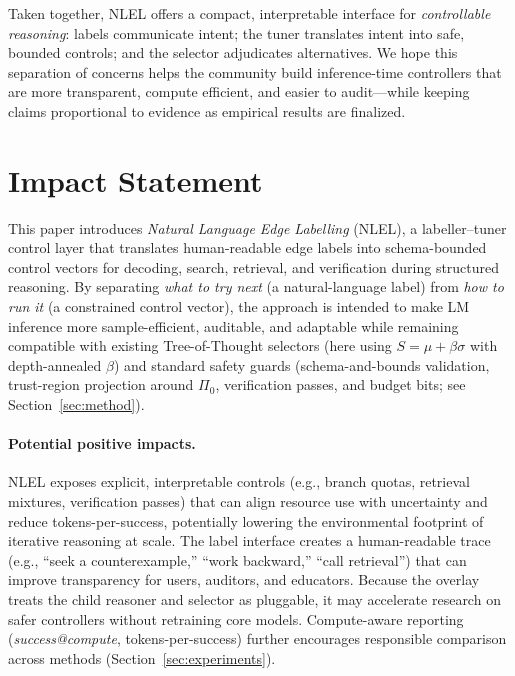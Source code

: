 \documentclass{article}
\theoremstyle{plain}
\theoremstyle{definition}
\theoremstyle{remark}
\begin{document}
Taken together, NLEL offers a compact, interpretable interface for \emph{controllable reasoning}: labels communicate intent; the tuner translates intent into safe, bounded controls; and the selector adjudicates alternatives. We hope this separation of concerns helps the community build inference-time controllers that are more transparent, compute efficient, and easier to audit---while keeping claims proportional to evidence as empirical results are finalized.

\section*{Impact Statement}

This paper introduces \emph{Natural Language Edge Labelling} (NLEL), a
labeller--tuner control layer that translates human-readable edge labels
into schema-bounded control vectors for decoding, search, retrieval, and
verification during structured reasoning. By separating \emph{what to try next}
(a natural-language label) from \emph{how to run it} (a constrained control vector),
the approach is intended to make LM inference more sample-efficient,
auditable, and adaptable while remaining compatible with existing
Tree-of-Thought selectors (here using $S=\mu+\beta\sigma$ with depth-annealed
$\beta$) and standard safety guards (schema-and-bounds validation,
trust-region projection around $\Pi_0$, verification passes, and budget bits;
see Section~\ref{sec:method}).

\paragraph{Potential positive impacts.}
NLEL exposes explicit, interpretable controls (e.g., branch quotas,
retrieval mixtures, verification passes) that can align resource use with
uncertainty and reduce tokens-per-success, potentially lowering the
environmental footprint of iterative reasoning at scale. The label interface
creates a human-readable trace (e.g., ``seek a counterexample,'' ``work
backward,'' ``call retrieval'') that can improve transparency for users,
auditors, and educators. Because the overlay treats the child reasoner and
selector as pluggable, it may accelerate research on safer controllers
without retraining core models. Compute-aware reporting
(\emph{success@compute}, tokens-per-success) further encourages responsible
comparison across methods (Section~\ref{sec:experiments}).
\end{document}
